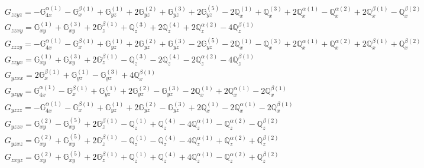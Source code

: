 \documentclass[fleqn,8pt,landscape]{jsarticle}
\begin{document}
\begin{align*}
& G_{zzyz} = - \mathbb{G}_{4x}^{\alpha(1)} - \mathbb{G}_{x}^{\beta(1)} + \mathbb{G}_{yz}^{(1)} + 2 \mathbb{G}_{yz}^{(2)} + \mathbb{G}_{yz}^{(3)} + 2 \mathbb{G}_{yz}^{(5)} - 2 \mathbb{Q}_{x}^{(1)} + \mathbb{Q}_{x}^{(3)} + 2 \mathbb{Q}_{x}^{\alpha(1)} - \mathbb{Q}_{x}^{\alpha(2)} + 2 \mathbb{Q}_{x}^{\beta(1)} - \mathbb{Q}_{x}^{\beta(2)} \\
& G_{zzxy} = \mathbb{G}_{xy}^{(1)} + \mathbb{G}_{xy}^{(3)} + 2 \mathbb{G}_{z}^{\beta(1)} + \mathbb{Q}_{z}^{(3)} + 2 \mathbb{Q}_{z}^{(4)} + 2 \mathbb{Q}_{z}^{\alpha(2)} - 4 \mathbb{Q}_{z}^{\beta(1)} \\
& G_{zzzy} = - \mathbb{G}_{4x}^{\alpha(1)} - \mathbb{G}_{x}^{\beta(1)} + \mathbb{G}_{yz}^{(1)} + 2 \mathbb{G}_{yz}^{(2)} + \mathbb{G}_{yz}^{(3)} - 2 \mathbb{G}_{yz}^{(5)} - 2 \mathbb{Q}_{x}^{(1)} - \mathbb{Q}_{x}^{(3)} + 2 \mathbb{Q}_{x}^{\alpha(1)} + \mathbb{Q}_{x}^{\alpha(2)} + 2 \mathbb{Q}_{x}^{\beta(1)} + \mathbb{Q}_{x}^{\beta(2)} \\
& G_{zzyx} = \mathbb{G}_{xy}^{(1)} + \mathbb{G}_{xy}^{(3)} + 2 \mathbb{G}_{z}^{\beta(1)} - \mathbb{Q}_{z}^{(3)} - 2 \mathbb{Q}_{z}^{(4)} - 2 \mathbb{Q}_{z}^{\alpha(2)} - 4 \mathbb{Q}_{z}^{\beta(1)} \\
& G_{yzxx} = 2 \mathbb{G}_{x}^{\beta(1)} + \mathbb{G}_{yz}^{(1)} - \mathbb{G}_{yz}^{(3)} + 4 \mathbb{Q}_{x}^{\beta(1)} \\
& G_{yzyy} = \mathbb{G}_{4x}^{\alpha(1)} - \mathbb{G}_{x}^{\beta(1)} + \mathbb{G}_{yz}^{(1)} + 2 \mathbb{G}_{yz}^{(2)} - \mathbb{G}_{yz}^{(3)} - 2 \mathbb{Q}_{x}^{(1)} + 2 \mathbb{Q}_{x}^{\alpha(1)} - 2 \mathbb{Q}_{x}^{\beta(1)} \\
& G_{yzzz} = - \mathbb{G}_{4x}^{\alpha(1)} - \mathbb{G}_{x}^{\beta(1)} + \mathbb{G}_{yz}^{(1)} + 2 \mathbb{G}_{yz}^{(2)} - \mathbb{G}_{yz}^{(3)} + 2 \mathbb{Q}_{x}^{(1)} - 2 \mathbb{Q}_{x}^{\alpha(1)} - 2 \mathbb{Q}_{x}^{\beta(1)} \\
& G_{yzzx} = \mathbb{G}_{xy}^{(2)} - \mathbb{G}_{xy}^{(5)} + 2 \mathbb{G}_{z}^{\beta(1)} - \mathbb{Q}_{z}^{(1)} + \mathbb{Q}_{z}^{(4)} - 4 \mathbb{Q}_{z}^{\alpha(1)} - \mathbb{Q}_{z}^{\alpha(2)} - \mathbb{Q}_{z}^{\beta(2)} \\
& G_{yzxz} = \mathbb{G}_{xy}^{(2)} + \mathbb{G}_{xy}^{(5)} + 2 \mathbb{G}_{z}^{\beta(1)} - \mathbb{Q}_{z}^{(1)} - \mathbb{Q}_{z}^{(4)} - 4 \mathbb{Q}_{z}^{\alpha(1)} + \mathbb{Q}_{z}^{\alpha(2)} + \mathbb{Q}_{z}^{\beta(2)} \\
& G_{zxyz} = \mathbb{G}_{xy}^{(2)} + \mathbb{G}_{xy}^{(5)} + 2 \mathbb{G}_{z}^{\beta(1)} + \mathbb{Q}_{z}^{(1)} + \mathbb{Q}_{z}^{(4)} + 4 \mathbb{Q}_{z}^{\alpha(1)} - \mathbb{Q}_{z}^{\alpha(2)} + \mathbb{Q}_{z}^{\beta(2)} \\

\end{align*}
\end{document}
